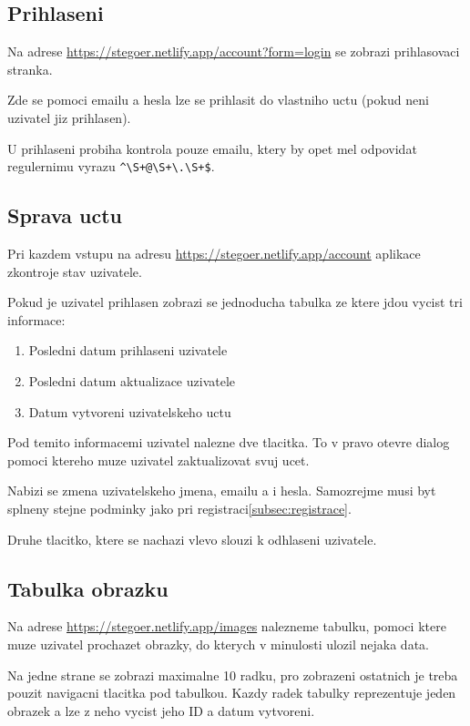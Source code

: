 \subsection{Prihlaseni}\label{subsec:prihlaseni}
Na adrese \url{https://stegoer.netlify.app/account?form=login} se zobrazi
prihlasovaci stranka.

Zde se pomoci emailu a hesla lze se prihlasit do vlastniho uctu (pokud neni
uzivatel jiz prihlasen).

U prihlaseni probiha kontrola pouze emailu, ktery by opet mel odpovidat
regulernimu vyrazu \verb/^\S+@\S+\.\S+$/.

\subsection{Sprava uctu}\label{subsec:sprava-uctu}
Pri kazdem vstupu na adresu \url{https://stegoer.netlify.app/account} aplikace
zkontroje stav uzivatele.

Pokud je uzivatel prihlasen zobrazi se jednoducha tabulka ze ktere jdou vycist
tri informace:

\begin{enumerate}
    \item Posledni datum prihlaseni uzivatele
    \item Posledni datum aktualizace uzivatele
    \item Datum vytvoreni uzivatelskeho uctu
\end{enumerate}

Pod temito informacemi uzivatel nalezne dve tlacitka.
To v pravo otevre dialog pomoci ktereho muze uzivatel zaktualizovat svuj ucet.

Nabizi se zmena uzivatelskeho jmena, emailu a i hesla.
Samozrejme musi byt splneny stejne podminky jako pri registraci\ref{subsec:registrace}.

Druhe tlacitko, ktere se nachazi vlevo slouzi k odhlaseni uzivatele.

\subsection{Tabulka obrazku}\label{subsec:tabulka-obrazku}
Na adrese \url{https://stegoer.netlify.app/images} nalezneme tabulku, pomoci
ktere muze uzivatel prochazet obrazky, do kterych v minulosti ulozil nejaka
data.

Na jedne strane se zobrazi maximalne 10 radku, pro zobrazeni ostatnich je treba
pouzit navigacni tlacitka pod tabulkou.
Kazdy radek tabulky reprezentuje jeden obrazek a lze z neho vycist jeho ID a
datum vytvoreni.

